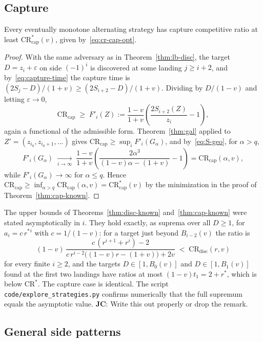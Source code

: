 \documentclass[runningheads,envcountsame,envcountsect]{llncs}
\newcommand\JC[1]{{\color{Maroon} \textbf{JC}: #1}}
\newcommand{\CR}{\mathrm{CR}}
\newcommand{\disc}{\mathrm{disc}}
\newcommand{\capt}{\mathrm{cap}}
\begin{document}
\subsection{Capture}

\begin{theorem}\label{thm:lb-cap}
Every eventually monotone alternating strategy has capture competitive ratio at least $\CR^{*}_{\capt}(v)$, given by~\eqref{eq:cr-cap-opt}.
\end{theorem}
\begin{proof}
With the same adversary as in Theorem~\ref{thm:lb-disc}, the target $D = z_i + \varepsilon$ on side $(-1)^i$ is discovered at some landing $j \geq i+2$, and by~\eqref{eq:capture-time} the capture time is $(2S_j - D)/(1+v) \geq (2S_{i+2} - D)/(1+v)$. Dividing by $D/(1-v)$ and letting $\varepsilon \to 0$,
\[
  \CR_{\capt} \;\geq\; F'_i(Z) := \frac{1-v}{1+v} \left( \frac{2 S_{i+2}(Z)}{z_i} - 1 \right) ,
\]
again a functional of the admissible form. Theorem~\ref{thm:gal} applied to $Z' = (z_{i_0}, z_{i_0+1}, \ldots)$ gives $\CR_{\capt} \geq \sup_i F'_i(G_\alpha)$, and by~\eqref{eq:S-geo}, for $\alpha > q$,
\[
  F'_i(G_\alpha) \;\xrightarrow[i \to \infty]{}\; \frac{1-v}{1+v}\left( \frac{2\alpha^3}{(1-v)\alpha - (1+v)} - 1 \right) = \CR_{\capt}(\alpha, v),
\]
while $F'_i(G_\alpha) \to \infty$ for $\alpha \leq q$. Hence $\CR_{\capt} \geq \inf_{\alpha > q} \CR_{\capt}(\alpha, v) = \CR^{*}_{\capt}(v)$ by the minimization in the proof of Theorem~\ref{thm:cap-known}.
\end{proof}

\begin{remark}\label{rem:tight}
The upper bounds of Theorems~\ref{thm:disc-known} and~\ref{thm:cap-known} were stated asymptotically in $i$. They hold exactly, as suprema over all $D \geq 1$, for $a_i = c\, r^{*} {}^i$ with $c = 1/(1-v)$: for a target just beyond $B_{i-2}(v)$ the ratio is
\[
  (1-v)\,\frac{c\,(r^{i+1} + r^{i}) - 2}{c\, r^{i-2}\big((1-v) r - (1+v)\big) + 2v} \;<\; \CR_{\disc}(r, v)
\]
for every finite $i \geq 2$, and the targets $D \in [1, B_0(v)]$ and $D \in [1, B_1(v)]$ found at the first two landings have ratios at most $(1-v) t_1 = 2 + r^{*}$, which is below $\CR^{*}$. The capture case is identical. The script \texttt{code/explore\_strategies.py} confirms numerically that the full supremum equals the asymptotic value. \JC{Write this out properly or drop the remark.}
\end{remark}

\subsection{General side patterns}\label{sec:lower-general}
\end{document}
